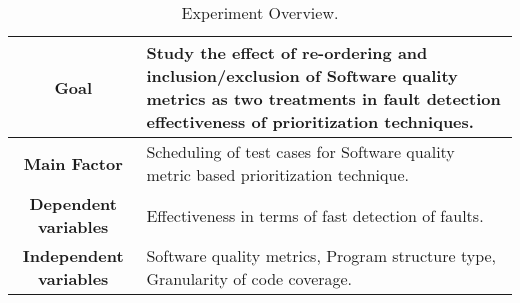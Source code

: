 \documentclass{sig-alternate}
\begin{document}
\begin{comment}
\begin{table}
\centering
\caption{Frequency of Special Characters}
\begin{tabular}{|c|c|l|} \hline
Non-English or Math&Frequency&Comments\\ \hline
\O & 1 in 1,000& For Swedish names\\ \hline
$\pi$ & 1 in 5e& Common in math\\ \hline
\$ & 4 in 5 & Used in business\\ \hline
$\Psi^2_1$ & 1 in 40,000& Unexplained usage\\
\hline\end{tabular}
\end{table}
\end{comment}

\begin{table*}
\centering
\caption{Experiment Overview.}
\begin{tabular}{|c l|} \hline
\textbf{Goal} & \multicolumn{1}{p{13cm}|}{Study the effect of re-ordering and inclusion/exclusion of Software quality metrics as two treatments in fault detection effectiveness of prioritization techniques.} \\ \hline
\textbf{Main
Factor}& Scheduling of test cases for Software quality metric based prioritization technique.\\ \hline
\textbf{Dependent
variables}& Effectiveness in terms of fast detection of faults.\\ \hline
\textbf{Independent variables}& Software quality metrics, Program structure type, Granularity of code coverage.\\ \hline\end{tabular}
\end{table*}
\end{document}
